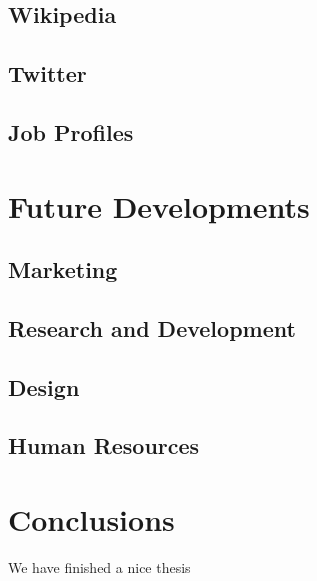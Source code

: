 \documentclass[]{book}
\theoremstyle{definition}
\theoremstyle{definition}
\theoremstyle{definition}
\theoremstyle{remark}
\begin{document}
\section{Wikipedia}\label{wikipedia-1}

\section{Twitter}\label{twitter-1}

\section{Job Profiles}\label{job-profiles-1}

\chapter{Future Developments}\label{future-developments}

\section{Marketing}\label{marketing}

\section{Research and Development}\label{research-and-development}

\section{Design}\label{design}

\section{Human Resources}\label{human-resources}

\chapter{Conclusions}\label{conclusions}

We have finished a nice thesis


\end{document}

